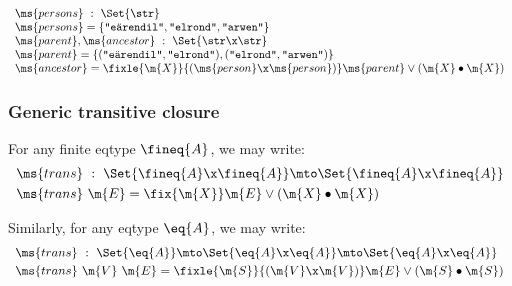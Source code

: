 \documentclass[preprint]{sigplanconf}
\begin{document}
\[\begin{array}{l}
\ms{persons} ~:~ \Set{\str}\\
\ms{persons} = \{\texttt{"e\"arendil"}, \texttt{"elrond"}, \texttt{"arwen"}\}\\
\ms{parent}, \ms{ancestor} ~:~ \Set{\str \x \str}\\
\ms{parent} = \{(\texttt{"e\"arendil"}, \texttt{"elrond"}),
(\texttt{"elrond"}, \texttt{"arwen"})\}\\
\ms{ancestor} = \fixle{\m{X}}{(\ms{person} \x \ms{person})}
\ms{parent} \vee (\m{X} \bullet \m{X})
\end{array}\]

\subsubsection{Generic transitive closure}

For any finite eqtype $\fineq{A}$, we may write:
\[\begin{array}{l}
\ms{trans} ~:~ \Set{\fineq{A} \x \fineq{A}} \mto \Set{\fineq{A} \x \fineq{A}}
\vspace{0.3em}\\
\ms{trans}\ \m{E} = \fix{\m{X}} \m{E} \vee (\m{X} \bullet \m{X})
\end{array}\]

\noindent Similarly, for any eqtype $\eq{A}$, we may write:
\[\begin{array}{l}
\ms{trans} ~:~
\Set{\eq{A}} \mto \Set{\eq{A} \x \eq{A}} \mto \Set{\eq{A} \x \eq{A}}
\vspace{0.3em}\\
\ms{trans}\ \m{V}\ \m{E} = %
\fixle{\m{S}}{(\m{V} \x \m{V})} \m{E} \vee (\m{S} \bullet \m{S})
\end{array}\]
\end{document}
